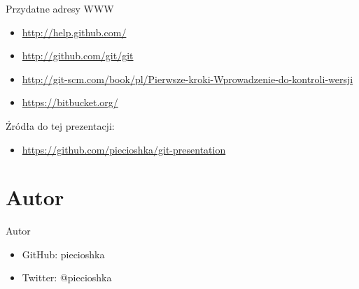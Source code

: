 \documentclass{beamer}
\begin{document}
\begin{frame}{Przydatne adresy WWW}
\begin{itemize}
  \item \url{http://help.github.com/}
  \item \url{http://github.com/git/git}
  \item \url{http://git-scm.com/book/pl/Pierwsze-kroki-Wprowadzenie-do-kontroli-wersji}
  \item \url{https://bitbucket.org/}
\end{itemize}
\vskip 1cm
Źródła do tej prezentacji:
\begin{itemize}
  \item \url{https://github.com/piecioshka/git-presentation}

\end{itemize}
\end{frame}


\section{Autor}

\begin{frame}{Autor}
\begin{itemize}
  \item GitHub: piecioshka
  \item Twitter: @piecioshka
\end{itemize}
\end{frame}
\end{document}
